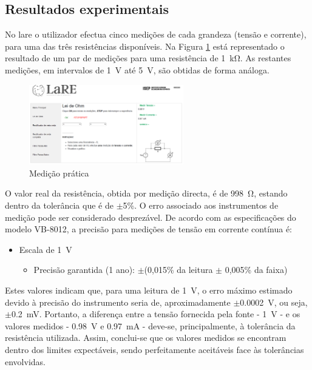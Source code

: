 \subsection{Resultados experimentais}
\label{sec:resultados_praticosOHM}
No \acrshort{lare} o utilizador efectua cinco medições de cada grandeza (tensão e corrente), para uma das três resistências disponíveis. Na Figura \ref{fig:resultados_medicoes_1k} está representado o resultado de um par de medições para uma resistência de \SI{1}{\kilo\ohm}. As restantes medições, em intervalos de \SI{1}{\volt} até \SI{5}{\volt}, são obtidas de forma análoga.

\begin{figure}[hbtp]
	\centering
	\includegraphics[width=0.6\textwidth]{figures/resultados_medicoes_ohm.png}
	\caption{Medição prática}
	\label{fig:resultados_medicoes_1k}
\end{figure}

O valor real da resistência, obtida por medição directa, é de \SI{998}{\ohm}, estando dentro da tolerância que é de $\pm$5\%. O erro associado aos instrumentos de medição pode ser considerado desprezável. De acordo com as especificações do modelo VB-8012\cite{datasheetvb8012}, a precisão para medições de tensão em corrente contínua é:

\begin{itemize}
	\item Escala de \SI{1}{\volt}
	\begin{itemize}
		\item Precisão garantida (1 ano): $\pm$(0,015\% da leitura $\pm$ 0,005\% da faixa)
	\end{itemize}
\end{itemize}

Estes valores indicam que, para uma leitura de \SI{1}{\volt}, o erro máximo estimado devido à precisão do instrumento seria de, aproximadamente $\pm$\SI{0,0002}{\volt}, ou seja, $\pm$\SI{0,2}{\milli\volt}. Portanto, a diferença entre a tensão fornecida pela fonte - \SI{1}{\volt} - e os valores medidos - \SI{0,98}{\volt} e \SI{0,97}{\milli\ampere} - deve-se, principalmente, à tolerância da resistência utilizada. Assim, conclui-se que os valores medidos se encontram dentro dos limites expectáveis, sendo perfeitamente aceitáveis face às tolerâncias envolvidas.


